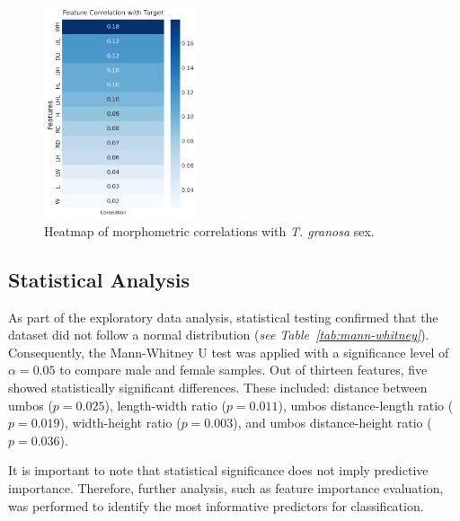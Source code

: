 \vspace{0.5cm}
\begin{figure}[!htbp]
	\centering
	\includegraphics[width=0.4\textwidth]{figures/heatmap.png}
	\caption{Heatmap of morphometric correlations with \textit{T. granosa} sex.}
	\label{fig:heatmap}
\end{figure}

\newpage
\subsection{Statistical Analysis}

As part of the exploratory data analysis, statistical testing confirmed that the dataset did not follow a normal distribution (\textit{see Table~\ref{tab:mann-whitney}}). Consequently, the Mann-Whitney U test was applied with a significance level of $\alpha = 0.05$ to compare male and female samples. Out of thirteen features, five showed statistically significant differences. These included: distance between umbos ($p = 0.025$), length-width ratio ($p = 0.011$), umbos distance-length ratio ($p = 0.019$), width-height ratio ($p = 0.003$), and umbos distance-height ratio ($p = 0.036$). 

It is important to note that statistical significance does not imply predictive importance. Therefore, further analysis, such as feature importance evaluation, was performed to identify the most informative predictors for classification.

